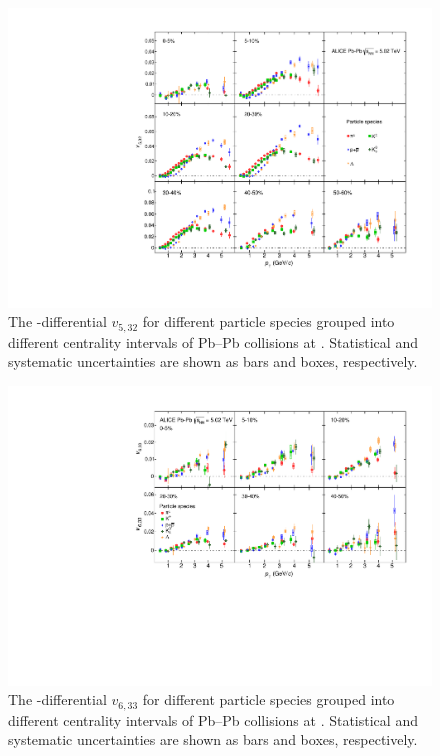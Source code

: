 \begin{figure}[!htb]
\begin{center}
\includegraphics[scale=0.82]{figures/results/All_v523_gap00_PID2_3by3.pdf}
\end{center}
\caption{The \pT-differential $v_{5,32}$ for different particle species grouped into different centrality intervals of Pb--Pb collisions at \sNN. Statistical and systematic uncertainties are shown as bars and boxes, respectively.}
\label{v523_particleDependence}
\end{figure}

\begin{figure}[!htb]
\begin{center}
\includegraphics[scale=0.82]{figures/results/All_v633_gap00_PID2_3by2.pdf}

\end{center}
\caption{The \pT-differential $v_{6,33}$ for different particle species grouped into different centrality intervals of Pb--Pb collisions at \sNN. Statistical and systematic uncertainties are shown as bars and boxes, respectively.}
\label{v633_particleDependence}
\end{figure}

